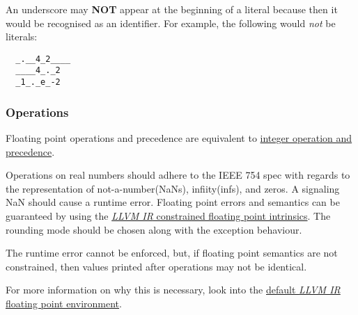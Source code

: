 \documentclass[types.tex]{subfiles}
\begin{document}
An underscore may \textbf{NOT} appear at the beginning of a  literal because then it
would be recognised as an identifier. For example, the following would
\textit{not} be  literals:
\begin{lstlisting}
  _.__4_2____
  ____4_._2
  _1_._e_-2
\end{lstlisting}

\subsubsection{Operations}
\label{sssec:real_ops}
Floating point operations and precedence are equivalent to \hyperref[sssec:integer_ops]{integer
operation and precedence}.

Operations on real numbers should adhere to the \textsf{IEEE 754} spec with regards to the
representation of not-a-number(NaNs), infiity(infs), and zeros. A signaling NaN should cause a
runtime error. Floating point errors and semantics can be guaranteed by using the
\href{https://llvm.org/docs/LangRef.html\#constrained-floating-point-intrinsics}{\textit{LLVM IR}
constrained floating point intrinsics}. The  rounding  mode should be chosen
along with the  exception behaviour.

The runtime error cannot be enforced, but, if floating point semantics are not constrained, then
 values printed after operations may not be identical.


For more information on why this is necessary, look into the
\href{https://llvm.org/docs/LangRef.html\#floatenv}{default \textit{LLVM IR} floating point
environment}.
\end{document}

